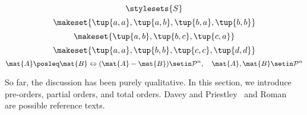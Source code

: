 {\begin{forslides}
\begin{equation}
            \label{eq:pow_7}
            \stylesets{S}
        \end{equation}
        \begin{equation}
            \label{eq:pre_ex1}
            \makeset{\tup{a,a},\tup{a,b},\tup{b,a},\tup{b,b}}
        \end{equation}
        \begin{equation}
            \label{eq:pre_ex2}
            \makeset{\tup{a,b},\tup{b,c},\tup{c,a}}
        \end{equation}
        \begin{equation}
            \label{eq:pre_ex3}
            \makeset{\tup{a,a},\tup{b,b},\tup{c,c},\tup{d,d}}
        \end{equation}
        \begin{equation}
            \label{eq:posdef_1}
            \mat{A}\posleq \mat{B} \Leftrightarrow (\mat{A}-\mat{B})\setin \mathcal{P}^n, \quad \mat{A},\mat{B}\setin \mathcal{P}^n
        \end{equation}
    \end{forslides}
}

%


So far, the discussion has been purely qualitative.
In this section, we introduce pre-orders, partial orders, and total orders.
Davey and Priestley~\cite{davey02} and Roman~\cite{roman08} are possible reference texts.

